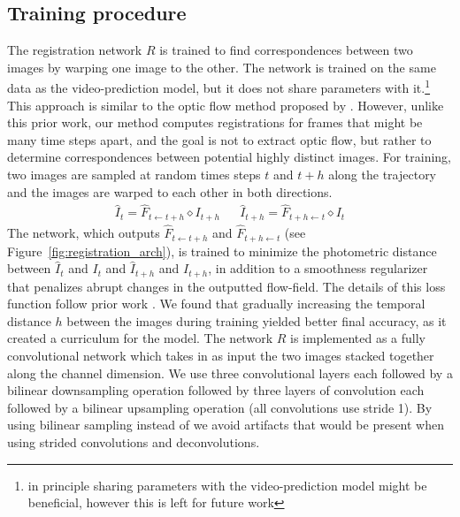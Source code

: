 \subsection{Training procedure}

The registration network $R$ is trained to find correspondences between two images by warping one image to the other. The network is trained on the same data as the video-prediction model, but it does not share parameters with it.\footnote{in principle sharing parameters with the video-prediction model might be beneficial, however this is left for future work} This approach is similar to the optic flow method proposed by \citet{meister2017unflow}. However, unlike this prior work, our method computes registrations for frames that might be many time steps apart, and the goal is not to extract optic flow, but rather to determine correspondences between potential highly distinct images. For training, two images are sampled at random times steps $t$ and $t+h$ along the trajectory and the images are warped to each other in both directions. 
\begin{align}
     \hat{I}_{t} = \hat{F}_{t \leftarrow t +h} \diamond  I_{t+h} &&
     \hat{I}_{t+h} = \hat{F}_{t+h \leftarrow t} \diamond  I_{t}
\end{align}
The network, which outputs $\hat{F}_{t \leftarrow t +h}$ and $\hat{F}_{t+h \leftarrow t}$ (see Figure~\ref{fig:registration_arch}), is trained to minimize the photometric distance between $\hat{I}_t$ and $I_t$ and $\hat{I}_{t+h}$ and $I_{t+h}$, in addition to a smoothness regularizer that penalizes abrupt changes in the outputted flow-field. The details of this loss function follow prior work \cite{meister2017unflow}. We found that gradually increasing the temporal distance $h$ between the images during training yielded better final accuracy, as it created a curriculum for the model. The network $R$ is implemented as a fully convolutional network which takes in as input the two images stacked together along the channel dimension. We use three convolutional layers each followed by a bilinear downsampling operation followed by three layers of convolution each followed by a bilinear upsampling operation (all convolutions use stride 1). By using bilinear sampling instead of we avoid artifacts that would be present when using strided convolutions and deconvolutions.